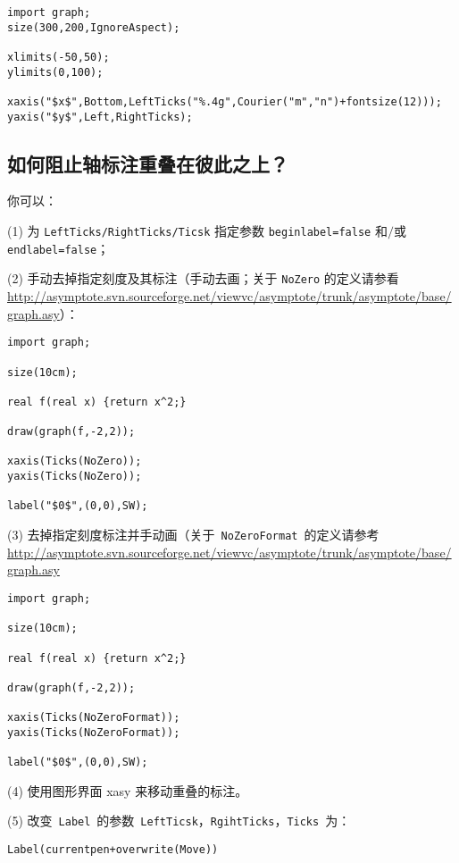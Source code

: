 \begin{lstlisting}
import graph;
size(300,200,IgnoreAspect);

xlimits(-50,50);
ylimits(0,100);

xaxis("$x$",Bottom,LeftTicks("%.4g",Courier("m","n")+fontsize(12)));
yaxis("$y$",Left,RightTicks);
\end{lstlisting}


\subsection{\label{Q6.7}如何阻止轴标注重叠在彼此之上？}

你可以：

(1) 为 \verb|LeftTicks/RightTicks/Ticsk| 指定参数 \verb|beginlabel=false| 和$/$或 \verb|endlabel=false|；

(2) 手动去掉指定刻度及其标注（手动去画；关于 \verb|NoZero| 的定义请参看
\url{http://asymptote.svn.sourceforge.net/viewvc/asymptote/trunk/asymptote/base/graph.asy}）：

\begin{lstlisting}
import graph;

size(10cm);

real f(real x) {return x^2;}
 
draw(graph(f,-2,2));

xaxis(Ticks(NoZero));
yaxis(Ticks(NoZero));

label("$0$",(0,0),SW);
\end{lstlisting}
(3) 去掉指定刻度标注并手动画（关于~\verb|NoZeroFormat|~的定义请参考
\url{http://asymptote.svn.sourceforge.net/viewvc/asymptote/trunk/asymptote/base/graph.asy}
\begin{lstlisting}
import graph;

size(10cm);

real f(real x) {return x^2;}
 
draw(graph(f,-2,2));

xaxis(Ticks(NoZeroFormat));
yaxis(Ticks(NoZeroFormat));

label("$0$",(0,0),SW);
\end{lstlisting}

(4) 使用图形界面 xasy 来移动重叠的标注。


(5) 改变~\verb|Label|~的参数~\verb|LeftTicsk|，\verb|RgihtTicks|，\verb|Ticks|~为：

\begin{lstlisting}
Label(currentpen+overwrite(Move))
\end{lstlisting}

